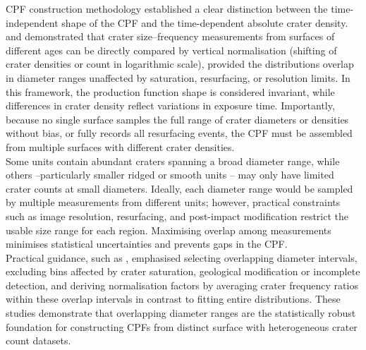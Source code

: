 \documentclass[preprint,11pt,3p,times,authoryear]{elsarticle}
\begin{document}
CPF construction methodology established a clear distinction between the time-independent shape of the CPF and the time-dependent absolute crater density. \citet{Neukum2001} and \citet{Ivanov2001} demonstrated that crater size–frequency measurements from surfaces of different ages can be directly compared by vertical normalisation (shifting of crater densities or count in logarithmic scale), provided the distributions overlap in diameter ranges unaffected by saturation, resurfacing, or resolution limits. In this framework, the production function shape is considered invariant, while differences in crater density reflect variations in exposure time. Importantly, because no single surface samples the full range of crater diameters or densities without bias, or fully records all resurfacing events, the CPF must be assembled from multiple surfaces with different crater densities.\\

Some units contain abundant craters spanning a broad diameter range, while others --particularly smaller ridged or smooth units -- may only have limited crater counts at small diameters. Ideally, each diameter range would be sampled by multiple measurements from different units; however, practical constraints such as image resolution, resurfacing, and post-impact modification restrict the usable size range for each region. Maximising overlap among measurements minimises statistical uncertainties and prevents gaps in the CPF.\\

Practical guidance, such as \citet{Neukum1983,Xiao2015,Robbins2018}, emphasised selecting overlapping diameter intervals, excluding bins affected by crater saturation, geological modification or incomplete detection, and deriving normalisation factors by averaging crater frequency ratios within these overlap intervals in contrast to fitting entire distributions. These studies demonstrate that overlapping diameter ranges are the statistically robust foundation for constructing CPFs from distinct surface with heterogeneous crater count datasets.\\
\end{document}
